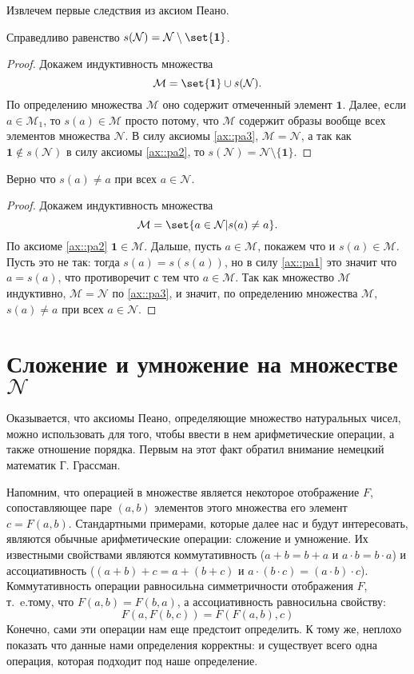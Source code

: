 \documentclass{article}
\newcommand{\ie}{т{.}~e{.}}
\begin{document}
Извлечем первые следствия из аксиом Пеано. 
\begin{lemma}
    \label{lm::shifting-lemma-1}
    Справедливо равенство \(s(\mathcal{N}) = \mathcal{N} \setminus \set{\mathbf{1}} \).
\end{lemma}
\begin{proof}
    Докажем индуктивность множества
    \[
        \mathcal{M} = \set{\mathbf{1}} \cup s(\mathcal{N}). 
    \]
    По определению множества \( \mathcal{M} \) оно содержит отмеченный элемент $\mathbf{1}$. Далее, если \( a \in \mathcal{M}_1 \), то \( s(a) \in \mathcal{M} \) просто потому, что \( \mathcal{M} \) содержит образы вообще всех элементов множества \( \mathcal{N} \). В силу аксиомы \ref{ax::pa3}, \( \mathcal{M} = \mathcal{N} \), а так как \( \mathbf{1} \notin s(\mathcal{N}) \) в силу аксиомы \ref{ax::pa2}, то \( s(\mathcal{N}) = \mathcal{N} \setminus \{\mathbf{1}\} \). 
\end{proof}
\begin{lemma}
    \label{lm::shifting-lemma-2}
    Верно что \( s(a) \neq a \) при всех \( a \in \mathcal{N} \).    
\end{lemma}
\begin{proof}
    Докажем индуктивность множества
    \[
        \mathcal{M} = \set{ a \in \mathcal{N} | s(a) \neq a }.
    \]
    По аксиоме \ref{ax::pa2} $\mathbf{1} \in \mathcal{M}$. Дальше, пусть $a \in \mathcal{M}$, покажем что и $s(a) \in \mathcal{M}$. Пусть это не так: тогда $s(a) = s(s(a))$, но в силу \ref{ax::pa1} это значит что $a = s(a)$, что противоречит с тем что $a \in \mathcal{M}$. Так как множество $\mathcal{M}$ индуктивно, $\mathcal{M} = \mathcal{N}$ по \ref{ax::pa3}, и значит, по определению множества $\mathcal{M}$,  \( s(a) \neq a \) при всех \( a \in \mathcal{N} \). 
\end{proof}

\section{Сложение и умножение на множестве \texorpdfstring{$\mathcal{N}$}{N}}
Оказывается, что аксиомы Пеано, определяющие множество натуральных чисел, можно использовать для того, чтобы ввести в нем арифметические операции, а также отношение порядка. Первым на этот факт обратил внимание немецкий математик Г. Грассман.

Напомним, что операцией в множестве является некоторое отображение $F$, сопоставляющее паре $(a, b)$ элементов этого множества его элемент $c = F(a, b)$. Стандартными примерами, которые далее нас и будут интересовать, являются обычные арифметические операции: сложение и умножение. Их известными свойствами являются коммутативность ($a + b = b + a$ и $a \cdot b = b \cdot a$) и ассоциативность ($(a + b) + c = a + (b + c)$ и $a \cdot (b \cdot c) = (a \cdot b) \cdot c$). Коммутативность операции равносильна симметричности отображения $F$, \ie тому, что $F(a, b) = F(b, a)$, а ассоциативность равносильна свойству:
\[
    F(a, F(b, c)) = F(F(a, b), c)
\]
Конечно, сами эти операции нам еще предстоит определить. К тому же, неплохо показать что данные нами определения корректны: и существует всего одна операция, которая подходит под наше определение.
\end{document}
